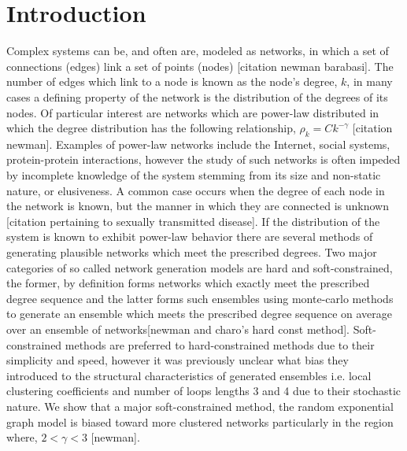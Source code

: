 \documentclass[aip,graphicx,amsmath]{revtex4-1}
\begin{document}
\section{Introduction}
Complex systems can be, and often are, modeled as networks, in which a set of connections (edges) link a set of points (nodes) [citation newman barabasi]. The number of edges which link to a node is known as the node's degree,  $k$, in many cases a defining property of the network is the distribution of the degrees of its nodes. Of particular interest are networks which are power-law distributed in which the degree distribution has the following relationship, $\rho_{k}=Ck^{-\gamma}$ [citation newman]. Examples of power-law networks include the Internet, social systems, protein-protein interactions, however the study of such networks is often impeded by incomplete knowledge of the system stemming from its size and non-static nature, or elusiveness. A common case occurs when the degree of each node in the network is known, but the manner in which they are connected is unknown [citation pertaining to sexually transmitted disease]. If the distribution of the system is known to exhibit power-law behavior there are several methods of generating plausible networks which meet the prescribed degrees. Two major categories of so called network generation models are hard and soft-constrained, the former, by definition forms networks which exactly meet the prescribed degree sequence and the latter forms such ensembles using monte-carlo methods to generate an ensemble which meets the prescribed degree sequence on average over an ensemble of networks[newman and charo's hard const method]. Soft-constrained methods are preferred to hard-constrained methods due to their simplicity and speed, however it was previously unclear what bias they introduced to the structural characteristics of generated ensembles i.e. local clustering coefficients and number of loops lengths 3 and 4 due to their stochastic nature. We show that a major soft-constrained method, the random exponential graph model is biased toward more clustered networks particularly in the region where, $2<\gamma<3$ [newman].
\end{document}
